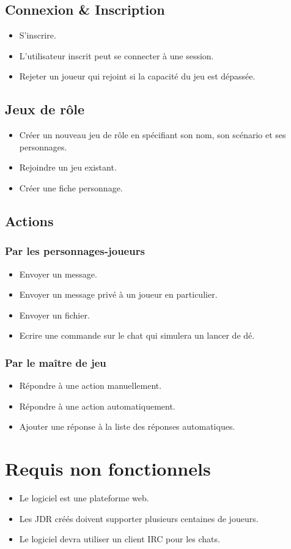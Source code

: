 \documentclass[12pt]{article}
\begin{document}
\subsection{Connexion \& Inscription}
\begin{itemize}
    \item S'inscrire.
    \item L'utilisateur inscrit peut se connecter à une session.
     \item Rejeter un joueur qui rejoint si la capacité du jeu est dépassée.
\end{itemize}
\subsection{Jeux de rôle}
\begin{itemize}
    \item Créer un nouveau jeu de rôle en spécifiant son nom, son scénario et ses personnages. 
    \item Rejoindre un jeu existant.
    \item Créer une fiche personnage.
\end{itemize}
\subsection{Actions}
\subsubsection{Par les personnages-joueurs}
\begin{itemize}
    \item Envoyer un message.
    \item Envoyer un message privé à un joueur en particulier.
    \item Envoyer un fichier.
    \item Ecrire une commande sur le chat qui simulera un lancer de dé.
\end{itemize}
\subsubsection{Par le maître de jeu}
\begin{itemize}
    \item Répondre à une action manuellement.
    \item Répondre à une action automatiquement.
    \item Ajouter une réponse à la liste des réponses automatiques.
  
\end{itemize}
\section{Requis non fonctionnels}
\begin{itemize}
    \item  Le logiciel est une plateforme web.
    \item  Les JDR créés doivent supporter plusieurs centaines de joueurs.
    \item  Le logiciel devra utiliser un client IRC pour les chats.
    \end{itemize}
%	
\end{document}
